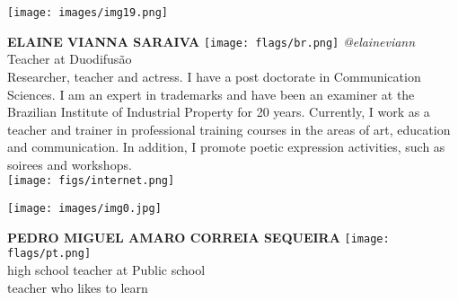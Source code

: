 \noindent
\begin{minipage}{0.3\textwidth}
\centering
\texttt{[image: images/img19.png]}
\end{minipage}
\hfill
\begin{minipage}{0.6\textwidth}\raggedright
\color{color1}\uppercase{\textbf{Elaine Vianna Saraiva}}
\color{color2}\hspace{0.2cm}\texttt{[image: flags/br.png]}
\hspace{0.2cm}\textit{@elaineviann}
\\
Teacher at Duodifusão\\
{\footnotesize 
Researcher, teacher and actress. I have a  post doctorate in Communication Sciences. I am an expert in trademarks and have been an examiner at the Brazilian Institute of Industrial Property  for 20 years. Currently, I work as a teacher and trainer in professional training courses in the areas of art, education and communication.
In addition, I promote poetic expression activities, such as soirees and workshops.}\\
\texttt{[image: figs/internet.png]}
\end{minipage}
\newline\newline\newline

\noindent
\begin{minipage}{0.3\textwidth}
\centering
\texttt{[image: images/img0.jpg]}
\end{minipage}
\hfill
\begin{minipage}{0.6\textwidth}\raggedright
\color{color1}\uppercase{\textbf{Pedro Miguel Amaro Correia Sequeira}}
\color{color2}\hspace{0.2cm}\texttt{[image: flags/pt.png]}
\\
high school teacher at Public school\\
{\footnotesize  teacher who likes to learn}\\
\end{minipage}
\newline\newline\newline

